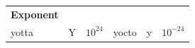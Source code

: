 {\begin{tabular}[t]{|l|l|l|l|l|l|}
        
                \textbf{Exponent}
     \tabularnewline\cline{1-1}\cline{2-2}\cline{3-3}\cline{4-4}\cline{5-5}\cline{6-6}
    
    
        yotta &
    
    
        Y &
    
    
        
                \begin{math}{10}^{24}\end{math}
               &
    
    
        yocto &
    
    
        y &
    
    
        
                \begin{math}{10}^{-24}\end{math}
     \tabularnewline\cline{1-1}\cline{2-2}\cline{3-3}\cline{4-4}\cline{5-5}\cline{6-6}
    

\end{tabular}}
